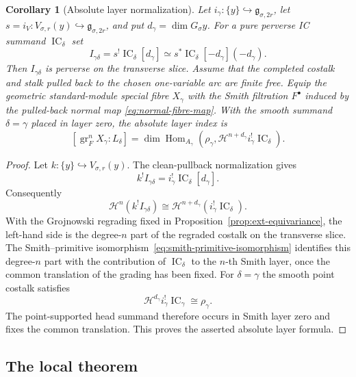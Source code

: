 \documentclass[11pt]{amsart}
\newtheorem{corollary}[theorem]{Corollary}
\theoremstyle{definition}
\theoremstyle{remark}
\newcommand{\IC}{\operatorname{IC}}
\begin{document}
\begin{corollary}[Absolute layer normalization]
\label{cor:absolute-layer-normalization}
Let $i_\gamma:\{y\}\hookrightarrow\mathfrak g_{\sigma,2r}$, let
$s=i_V:V_{\sigma,r}(y)\hookrightarrow\mathfrak g_{\sigma,2r}$, and put
$d_\gamma=\dim G_\sigma y$.  For a pure perverse IC summand $\IC_\delta$ set
\[
 I_{\gamma\delta}=s^!\IC_\delta[d_\gamma]
 \simeq s^*\IC_\delta[-d_\gamma](-d_\gamma).
\]
Then $I_{\gamma\delta}$ is perverse on the transverse slice.  Assume that
the completed costalk and stalk pulled back to the chosen one-variable arc
are finite free.  Equip the geometric standard-module special fibre
$X_\gamma$ with the Smith filtration $F^\bullet$ induced by the pulled-back
normal map \eqref{eq:normal-fibre-map}.  With the smooth summand $\delta=\gamma$ placed in
layer zero, the absolute layer index is
\[
 [\operatorname{gr}_F^nX_\gamma:L_\delta]
 =\dim\operatorname{Hom}_{A_\gamma}\!\left(
   \rho_\gamma,
   \mathcal H^{n+d_\gamma}i_\gamma^!\IC_\delta
 \right).
\]
\end{corollary}

\begin{proof}
Let $k:\{y\}\hookrightarrow V_{\sigma,r}(y)$.  The clean-pullback
normalization gives
\[
k^!I_{\gamma\delta}=i_\gamma^!\IC_\delta[d_\gamma].
\]
Consequently
\[
 \mathcal H^n(k^!I_{\gamma\delta})
 \cong
 \mathcal H^{n+d_\gamma}(i_\gamma^!\IC_\delta).
\]
With the Grojnowski regrading fixed in
Proposition~\ref{prop:ext-equivariance}, the left-hand side is the
degree-$n$ part of the regraded costalk on the transverse slice.  The
Smith--primitive isomorphism~\eqref{eq:smith-primitive-isomorphism}
identifies this degree-$n$ part with the contribution of $\IC_\delta$ to
the $n$-th Smith layer, once the common translation of the grading has
been fixed.  For
$\delta=\gamma$ the smooth point costalk satisfies
\[
 \mathcal H^{d_\gamma}i_\gamma^!\IC_\gamma\cong\rho_\gamma.
\]
The point-supported head summand therefore occurs in Smith layer zero and
fixes the common translation.  This proves the asserted absolute layer
formula.
\end{proof}

\subsection{The local theorem}
\end{document}
